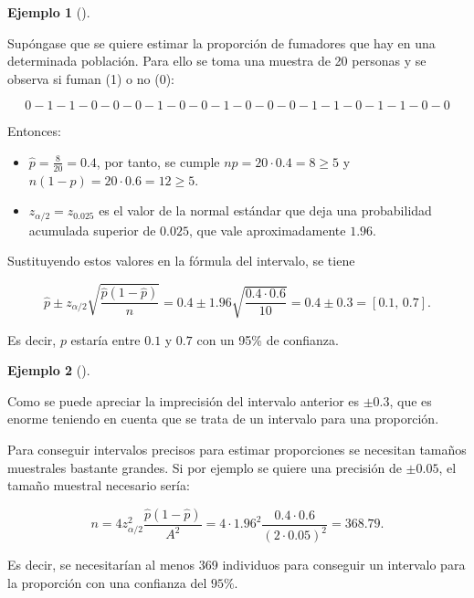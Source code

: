 \documentclass[
  a4paper,
]{scrreport}
\providecommand{\tightlist}{%
  \setlength{\itemsep}{0pt}\setlength{\parskip}{0pt}}\usepackage{longtable,booktabs,array}
\theoremstyle{plain}
\theoremstyle{definition}
\newtheorem{example}{Ejemplo}[chapter]
\theoremstyle{definition}
\theoremstyle{remark}
\begin{document}
\begin{example}[]\protect\hypertarget{exm-intervalo-confianza-proporcion}{}\label{exm-intervalo-confianza-proporcion}

Supóngase que se quiere estimar la proporción de fumadores que hay en
una determinada población. Para ello se toma una muestra de 20 personas
y se observa si fuman (1) o no (0):

\[
0 - 1 - 1 - 0 - 0 - 0 - 1 - 0 - 0 - 1 - 0 - 0 - 0 - 1 - 1- 0 - 1 - 1 - 0 - 0
\]

Entonces:

\begin{itemize}
\tightlist
\item
  \(\hat p=\frac{8}{20}=0.4\), por tanto, se cumple
  \(np=20\cdot 0.4 = 8\geq 5\) y \(n(1-p)=20\cdot 0.6= 12\geq 5\).
\item
  \(z_{\alpha/2}=z_{0.025}\) es el valor de la normal estándar que deja
  una probabilidad acumulada superior de \(0.025\), que vale
  aproximadamente \(1.96\).
\end{itemize}

Sustituyendo estos valores en la fórmula del intervalo, se tiene

\[
\hat{p}\pm z_{\alpha/2}\sqrt{\frac{\hat{p}(1-\hat{p})}{n}} = 0.4\pm 1.96\sqrt{\frac{0.4\cdot 0.6}{10}} = 0.4\pm  0.3 = \left[0.1,\,0.7\right].
\]

Es decir, \(p\) estaría entre \(0.1\) y \(0.7\) con un 95\% de
confianza.

\end{example}

\begin{example}[]\protect\hypertarget{exm-tamaño-muestral-intervalo-confianza-proporcion}{}\label{exm-tamaño-muestral-intervalo-confianza-proporcion}

Como se puede apreciar la imprecisión del intervalo anterior es
\(\pm 0.3\), que es enorme teniendo en cuenta que se trata de un
intervalo para una proporción.

Para conseguir intervalos precisos para estimar proporciones se
necesitan tamaños muestrales bastante grandes. Si por ejemplo se quiere
una precisión de \(\pm 0.05\), el tamaño muestral necesario sería:

\[
n= 4 z_{\alpha/2}^2\frac{\hat{p}(1-\hat{p})}{A^2}=4\cdot 1.96^2\frac{0.4\cdot 0.6}{(2\cdot0.05)^2}= 368.79.
\]

Es decir, se necesitarían al menos 369 individuos para conseguir un
intervalo para la proporción con una confianza del \(95\%\).

\end{example}
\end{document}
